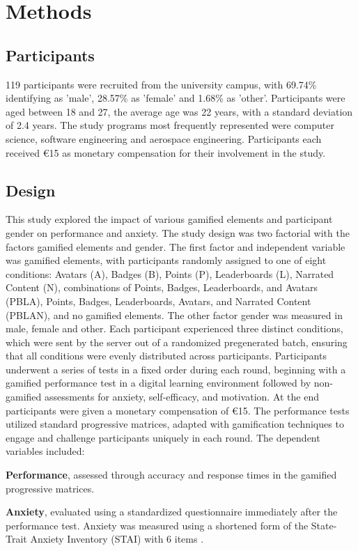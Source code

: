 \section{Methods}
\subsection{Participants}
119 participants were recruited from the university campus, with 69.74\% identifying as 'male', 28.57\% as 'female' and 1.68\% as 'other'.
Participants were aged between 18 and 27, the average age was 22 years, with a standard deviation of 2.4 years.
The study programs most frequently represented were computer science, software engineering and aerospace engineering.
Participants each received €15 as monetary compensation for their involvement in the study.

\subsection{Design}
This study explored the impact of various gamified elements and participant gender on performance and anxiety.
The study design was two factorial with the factors gamified elements and gender.
The first factor and independent variable was gamified elements, with participants randomly assigned to one of eight conditions:
Avatars (A), Badges (B), Points (P), Leaderboards (L), Narrated Content (N), combinations of Points, Badges, Leaderboards, and Avatars (PBLA), Points, Badges, Leaderboards, Avatars, and Narrated Content (PBLAN), and no gamified elements.
The other factor gender was measured in male, female and other.
Each participant experienced three distinct conditions, which were sent by the server out of a randomized pregenerated batch, ensuring that all conditions were evenly distributed across participants.
Participants underwent a series of tests in a fixed order during each round, beginning with a gamified performance test in a digital learning environment followed by non-gamified assessments for anxiety, self-efficacy, and motivation.
At the end participants were given a monetary compensation of €15.
The performance tests utilized standard progressive matrices, adapted with gamification techniques to engage and challenge participants uniquely in each round.
The dependent variables included:
\begin{APAitemize}
  \item \textbf{Performance}, assessed through accuracy and response times in the gamified progressive matrices.
  \item \textbf{Anxiety}, evaluated using a standardized questionnaire immediately after the performance test. Anxiety was measured using a shortened form of the State-Trait Anxiety Inventory (STAI) with 6 items \parencite{marteauDevelopmentSixitemShortform1992}.
\end{APAitemize}

